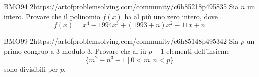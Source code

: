 \documentclass[12pt]{article}
\begin{document}
\begin{esercizio}{BMO94 2}{https://artofproblemsolving.com/community/c6h85218p495835}
Sia $n$ un intero. Provare che il polinomio $f(x)$ ha al più uno zero intero, dove
\[f(x)=x^{4}-1994x^{3}+(1993+n)x^{2}-11x+n\]
\end{esercizio}

\begin{esercizio}{BMO99 2}{https://artofproblemsolving.com/community/c6h85148p495342}
Sia $p$ un primo congruo a 3 modulo 3. Provare che al iù $p-1$ elementi dell'insieme 
\[\{m^{2}-n^{3}-1\mid 0<m,n<p\}\]
sono divisibili per $p$.
\end{esercizio}
\end{document}
